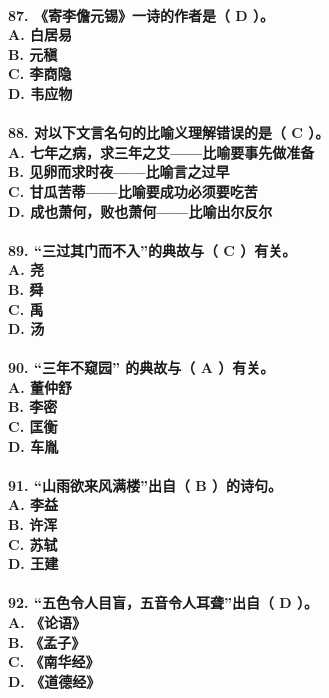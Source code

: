 \documentclass[UTF8]{ctexart} %
\begin{document}
\paragraph{
87. 《寄李儋元锡》一诗的作者是（ \color{red}D\color{black} ）。 \\
    A. 白居易 \\
    B. 元稹 \\
    C. 李商隐 \\
    D. 韦应物
}
\paragraph{
88. 对以下文言名句的比喻义理解错误的是（ \color{red}C\color{black} ）。 \\
    A. 七年之病，求三年之艾——比喻要事先做准备 \\
    B. 见卵而求时夜——比喻言之过早 \\
    C. 甘瓜苦蒂——比喻要成功必须要吃苦 \\
    D. 成也萧何，败也萧何——比喻出尔反尔
}
\paragraph{
89. “三过其门而不入”的典故与（ \color{red}C\color{black} ）有关。 \\
    A. 尧 \\
    B. 舜 \\
    C. 禹 \\
    D. 汤
}
\paragraph{
90. “三年不窥园” 的典故与（ \color{red}A\color{black} ）有关。 \\
    A. 董仲舒 \\
    B. 李密 \\
    C. 匡衡 \\
    D. 车胤
}
\paragraph{
91. “山雨欲来风满楼”出自（ \color{red}B\color{black} ）的诗句。 \\
    A. 李益 \\
    B. 许浑 \\
    C. 苏轼 \\
    D. 王建
}
\paragraph{
92. “五色令人目盲，五音令人耳聋”出自（ \color{red}D\color{black} ）。 \\
    A. 《论语》 \\
    B. 《孟子》 \\
    C. 《南华经》 \\
    D. 《道德经》
}
\end{document}
